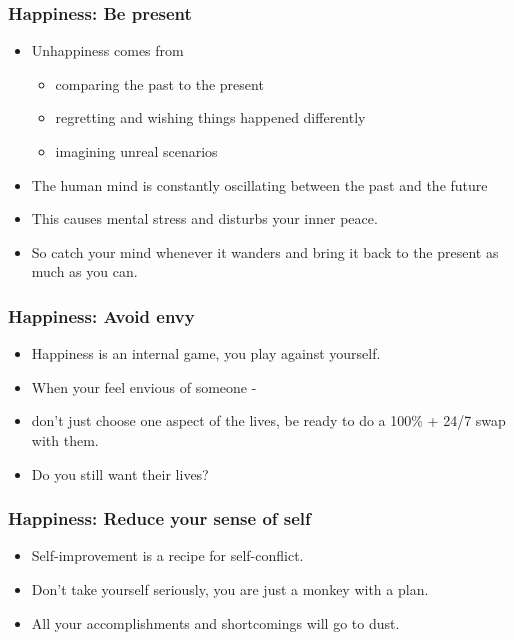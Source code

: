 \begin{frame}[fragile]\frametitle{ Happiness: Be present}
\begin{itemize}
\item Unhappiness comes from
\begin{itemize}
\item comparing the past to the present
\item regretting and wishing things happened differently
\item imagining unreal scenarios
\end{itemize}
\item The human mind is constantly oscillating between the past and the future
\item This causes mental stress and disturbs your inner peace.
\item So catch your mind whenever it wanders and bring it back to the present as much as you can.
\end{itemize}
\end{frame}

\begin{frame}[fragile]\frametitle{ Happiness: Avoid envy}
\begin{itemize}
\item Happiness is an internal game, you play against yourself. 
\item When your feel envious of someone - 
\item don’t just choose one aspect of the lives, be ready to do a 100\% + 24/7 swap with them.
\item Do you still want their lives?
\end{itemize}
\end{frame}

\begin{frame}[fragile]\frametitle{ Happiness: Reduce your sense of self}
\begin{itemize}
\item Self-improvement is a recipe for self-conflict.
\item Don’t take yourself seriously, you are just a monkey with a plan.
\item All your accomplishments and shortcomings will go to dust.
\end{itemize}
\end{frame}

